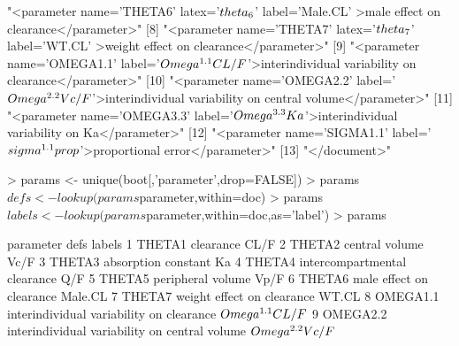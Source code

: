 \begin{Schunk}
\begin{Soutput}
 [7] "<parameter name='THETA6' latex='$\\theta_6$'                 label='Male.CL'                                >male effect on clearance</parameter>"          
 [8] "<parameter name='THETA7' latex='$\\theta_7$'                 label='WT.CL'                                  >weight effect on clearance</parameter>"        
 [9] "<parameter name='OMEGA1.1' label='$\\Omega^{1.1}CL/F$'>interindividual variability on clearance</parameter>"                                                
[10] "<parameter name='OMEGA2.2' label='$\\Omega^{2.2}Vc/F$'>interindividual variability on central volume</parameter>"                                           
[11] "<parameter name='OMEGA3.3' label='$\\Omega^{3.3}Ka$'>interindividual variability on Ka</parameter>"                                                         
[12] "<parameter name='SIGMA1.1' label='$\\sigma^{1.1}prop$'>proportional error</parameter>"                                                                      
[13] "</document>"                                                                                                                                                
\end{Soutput}
\begin{Sinput}
> params <- unique(boot[,'parameter',drop=FALSE])
> params$defs <- lookup(params$parameter,within=doc)
> params$labels <- lookup(params$parameter,within=doc,as='label')
> params
\end{Sinput}
\begin{Soutput}
   parameter                                          defs              labels
1     THETA1                                     clearance                CL/F
2     THETA2                                central volume                Vc/F
3     THETA3                           absorption constant                  Ka
4     THETA4                  intercompartmental clearance                 Q/F
5     THETA5                             peripheral volume                Vp/F
6     THETA6                      male effect on clearance             Male.CL
7     THETA7                    weight effect on clearance               WT.CL
8   OMEGA1.1      interindividual variability on clearance $\\Omega^{1.1}CL/F$
9   OMEGA2.2 interindividual variability on central volume $\\Omega^{2.2}Vc/F$

\end{Soutput}
\end{Schunk}
